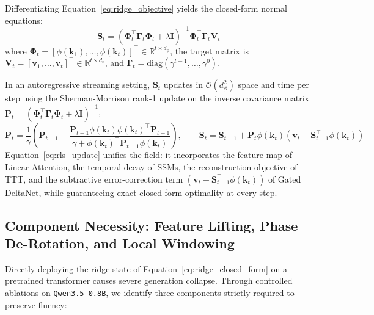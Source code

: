 \documentclass[11pt,a4paper]{article}
\begin{document}
Differentiating Equation~\ref{eq:ridge_objective} yields the closed-form normal equations:
\begin{equation}
\label{eq:ridge_closed_form}
\mathbf{S}_t = \left(\mathbf{\Phi}_t^\top \mathbf{\Gamma}_t \mathbf{\Phi}_t + \lambda \mathbf{I}\right)^{-1} \mathbf{\Phi}_t^\top \mathbf{\Gamma}_t \mathbf{V}_t
\end{equation}
where $\mathbf{\Phi}_t = [\phi(\mathbf{k}_1), \dots, \phi(\mathbf{k}_t)]^\top \in \mathbb{R}^{t \times d_\phi}$, the target matrix is $\mathbf{V}_t = [\mathbf{v}_1, \dots, \mathbf{v}_t]^\top \in \mathbb{R}^{t \times d_v}$, and $\mathbf{\Gamma}_t = \text{diag}(\gamma^{t-1}, \dots, \gamma^0)$.

In an autoregressive streaming setting, $\mathbf{S}_t$ updates in $\mathcal{O}(d_\phi^2)$ space and time per step using the Sherman-Morrison rank-1 update on the inverse covariance matrix $\mathbf{P}_t = (\mathbf{\Phi}_t^\top \mathbf{\Gamma}_t \mathbf{\Phi}_t + \lambda \mathbf{I})^{-1}$:
\begin{equation}
\label{eq:rls_update}
\mathbf{P}_t = \frac{1}{\gamma} \left( \mathbf{P}_{t-1} - \frac{\mathbf{P}_{t-1} \phi(\mathbf{k}_t) \phi(\mathbf{k}_t)^\top \mathbf{P}_{t-1}}{\gamma + \phi(\mathbf{k}_t)^\top \mathbf{P}_{t-1} \phi(\mathbf{k}_t)} \right), \qquad \mathbf{S}_t = \mathbf{S}_{t-1} + \mathbf{P}_t \phi(\mathbf{k}_t) \left(\mathbf{v}_t - \mathbf{S}_{t-1}^\top \phi(\mathbf{k}_t)\right)^\top
\end{equation}
Equation~\ref{eq:rls_update} unifies the field: it incorporates the feature map of Linear Attention, the temporal decay of SSMs, the reconstruction objective of TTT, and the subtractive error-correction term $(\mathbf{v}_t - \mathbf{S}_{t-1}^\top \phi(\mathbf{k}_t))$ of Gated DeltaNet, while guaranteeing exact closed-form optimality at every step.

\subsection{Component Necessity: Feature Lifting, Phase De-Rotation, and Local Windowing}
\label{sec:component_necessity}

Directly deploying the ridge state of Equation~\ref{eq:ridge_closed_form} on a pretrained transformer causes severe generation collapse. Through controlled ablations on \texttt{Qwen3.5-0.8B}, we identify three components strictly required to preserve fluency:
\end{document}
